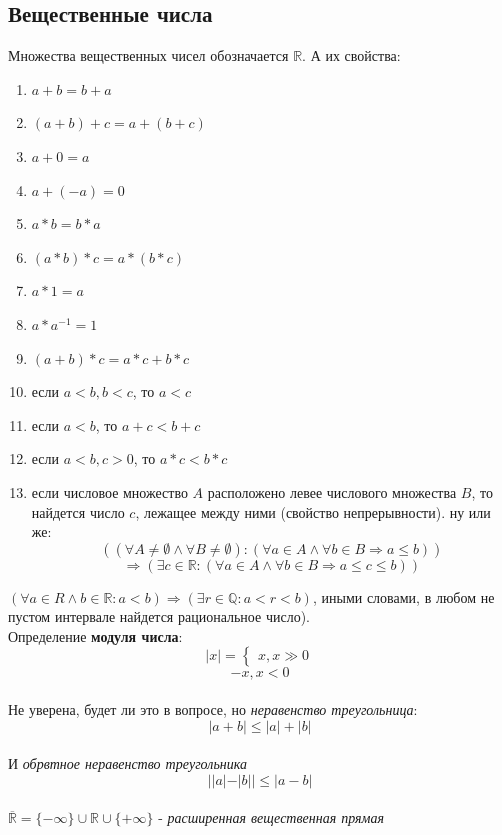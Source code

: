 \documentclass[10pt, a4paper,twocolumn]{article}
\begin{document}
\subsection{Вещественные числа}
Множества вещественных чисел обозначается $\mathbb{R}$. А их свойства:
\begin{enumerate}
    \item $a + b = b + a$
    \item $(a + b) + c = a + (b + c)$
    \item $a + 0 = a$
    \item $a + (-a) = 0$
    \item $a * b = b * a$
    \item $(a * b) * c = a * (b * c)$
    \item $a * 1 = a$
    \item $a * a^{-1} = 1$
    \item $(a + b) * c = a * c + b * c$
    \item если $a < b, b < c$, то $a < c$
    \item если $a < b$, то $a + c < b + c$
    \item если $a < b, c > 0$, то $a * c < b * c$
    \item если числовое множество $A$ расположено левее числового множества $B$, то найдется число $c$, лежащее между ними (свойство непрерывности). ну или же: $$((\forall A \neq \emptyset \land \forall B \neq \emptyset) : (\forall a \in A \land \forall b \in B \Rightarrow a \leq b))$$
    $$\Rightarrow (\exists c \in \mathbb{R} : (\forall a \in A \land \forall b \in B \Rightarrow a \leq c \leq b))$$
\end{enumerate}
$(\forall a \in R \land b \in \mathbb{R} : a < b) \Rightarrow (\exists r \in \mathbb{Q} : a < r < b)$, иными словами, в любом не пустом интервале найдется рациональное число).
\\Определение \textbf{модуля числа}: $$|x| =
\begin{cases}
    x, x \gg 0
\end{cases}$$
$$- x, x < 0$$
\\Не уверена, будет ли это в вопросе, но \textsl{неравенство треугольница}:
$$|a + b| \leq |a| + |b|$$
\\И \textsl{обрвтное неравенство треугольника}
$$||a| - |b|| \leq |a - b|$$
\\$\overline{\mathbb{R}} = \{-\infty \} \cup \mathbb{R} \cup \{+ \infty\}$ - \textsl{расширенная вещественная прямая}
\end{document}
